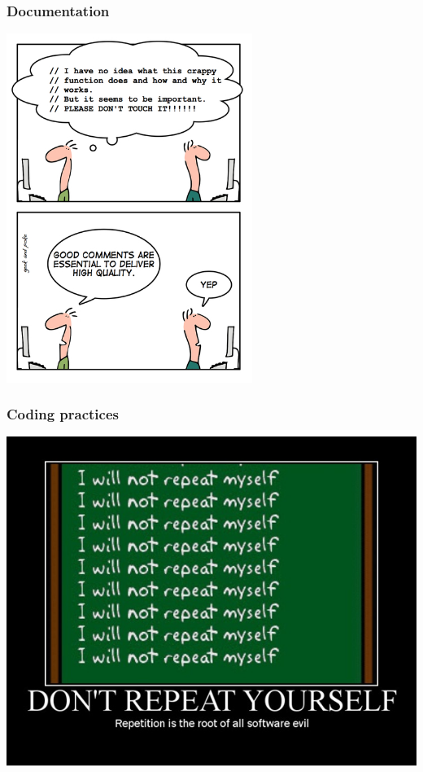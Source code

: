 \documentclass[14pt,notes]{beamer}
\begin{document}
\begin{frame}
\frametitle{Documentation}
\centering
\includegraphics[width=0.6\textwidth]{goodcomments}

\end{frame}

\begin{frame}
\frametitle{Coding practices}
\centering
\includegraphics[width=\textwidth]{dontrepeatyourself_motivator_2}

\end{frame}
\end{document}
